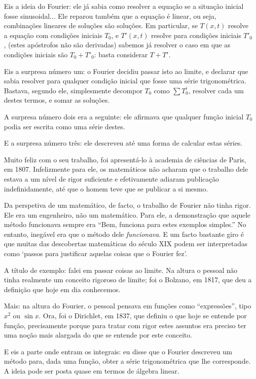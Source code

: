 \documentclass{article}
\begin{document}
Eis a ideia do Fourier: ele já sabia como resolver a equação se a situação inicial fosse sinusoidal... Ele reparou também que a equação é linear, ou seja, combinações lineares de soluções são soluções. Em particular, se $T(x,t)$ resolve a equação com condições iniciais $T_0$, e $T'(x,t)$ resolve para condições iniciais $T'_0$, (estes apóstrofos não são derivadas) sabemos já resolver o caso em que as condições iniciais são $T_0 + T'_0$: basta considerar $T + T'$.

Eis a surpresa número um: o Fourier decidiu passar isto ao limite, e declarar que sabia resolver para qualquer condição inicial que fosse uma série trigonométrica. Bastava, segundo ele, simplesmente decompor $T_0$ como $\sum T^i_0$, resolver cada um destes termos, e somar as soluções.

A surpresa número dois era a seguinte: ele afirmava que qualquer função inicial $T_0$ podia ser escrita como uma série destes.

E a surpresa número três: ele descreveu até uma forma de calcular estas séries.

Muito feliz com o seu trabalho, foi apresentá-lo à academia de ciências de Paris, em 1807. Infelizmente para ele, os matemáticos não acharam que o trabalho dele estava a um nível de rigor suficiente e efetivamente adiaram publicação indefinidamente, até que o homem teve que se publicar a si mesmo.

Da perspetiva de um matemático, de facto, o trabalho de Fourier não tinha rigor. Ele era um engenheiro, não um matemático. Para ele, a demonstração que aquele método funcionava sempre era ``Bem, funciona para estes exemplos simples.'' No entanto, inegável era que o método dele \emph{funcionava}. E um facto bastante giro é que muitas das descobertas matemáticas do século XIX podem ser interpretadas como `passos para justificar aquelas coisas que o Fourier fez'.

A título de exemplo: falei em passar coisas ao limite. Na altura o pessoal não tinha realmente um conceito rigoroso de limite; foi o Bolzano, em 1817, que deu a definição que hoje em dia conhecemos.

Mais: na altura do Fourier, o pessoal pensava em funções como ``expressões'', tipo $x^2$ ou $\sin x$. Ora, foi o Dirichlet, em 1837, que definiu o que hoje se entende por função, precisamente porque para tratar com rigor estes assuntos era preciso ter uma noção mais alargada do que se entende por este conceito.

E eis a parte onde entram os integrais: eu disse que o Fourier descreveu um método para, dada uma função, obter a série trigonométrica que lhe corresponde. A ideia pode ser posta quase em termos de álgebra linear.
\end{document}
